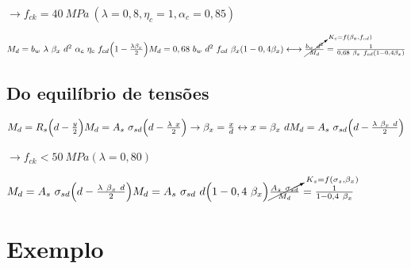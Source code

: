 \begin{resposta}
\begin{enumerate}[start=7]
        $\to f_{ck} = 40 \ MPa \ (\lambda = 0,8, \eta_c=1, \alpha_c=0,85)$

        $M_d = b_w \ \lambda \ \beta_x \ d^2 \ \alpha_c \ \eta_c \ f_{cd}\Big(1-\frac{\lambda \beta_x}{2}\Big) \newline M_d = 0,68 \ b_w \ d^2 \ f_{cd} \ \beta_x(1-0,4 \beta_x) \longleftrightarrow \cancelto{K_c=f(\beta_x,f_{cd})}{\frac{b_w \ d^2}{M_d}}=\frac{1}{0,68 \ \beta_x \ f_{cd} (1-0,4 \beta_x)}$ \newline

        \subsection*{Do equilíbrio de tensões}

        $M_d = R_s \Big(d-\frac{y}{2}\Big) \newline M_d = A_s \ \sigma_{sd} \Big(d-\frac{\lambda \ x}{2}\Big) \to \beta_x = \frac{x}{d} \leftrightarrow x = \beta_x \ d \newline M_d = A_s \ \sigma_{sd} \Big(d-\frac{\lambda \ \beta_x \ d}{2}\Big)$ \newline

        $\to f_{ck} < 50 \ MPa (\lambda = 0,80)$

        $M_d = A_s \ \sigma_{sd} \Big(d-\frac{\lambda \ \beta_x \ d}{2}\Big) \newline M_d = A_s \ \sigma_{sd} \ d\Big(1-0,4 \ \beta_x\Big) \newline \cancelto{K_s=f(\sigma_s,\beta_x)}{\frac{A_s \ \sigma_{sd}}{M_d}}=\frac{1}{1-0,4 \ \beta_x}$
    \end{enumerate}
\end{resposta}

\newpage

\section*{Exemplo}

